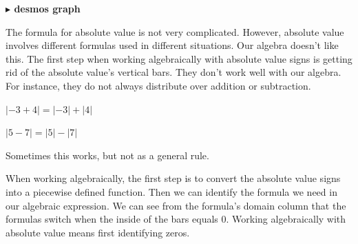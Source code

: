 \documentclass{ximera}
\begin{document}
\begin{example}
\begin{image}
\end{image}










\begin{onlineOnly}
\textbf{\textcolor{blue!55!black}{$\blacktriangleright$ desmos graph}} 
\begin{center}
\end{center}
\end{onlineOnly}






\end{example}

The formula for absolute value is not very complicated.  However, absolute value involves different formulas used in different situations.  Our algebra doesn't like this. The first step when working algebraically with absolute value signs is getting rid of the absolute value's vertical bars.  They don't work well with our algebra. For instance, they do not always distribute over addition or subtraction.


\begin{question}

$| -3 + 4 | = | -3 | + | 4 |$
  \begin{multipleChoice}
  \end{multipleChoice}
\end{question}


\begin{question}

$| 5 - 7 | = | 5 | - | 7 |$
  \begin{multipleChoice}
  \end{multipleChoice}
\end{question}


Sometimes this works, but not as a general rule.


When working algebraically, the first step is to convert the absolute value signs into a piecewise defined function. Then we can identify the formula we need in our algebraic expression.  We can see from the formula's domain column that the formulas switch when the inside of the bars equals $0$. Working algebraically with absolute value means first identifying zeros.
\end{document}

